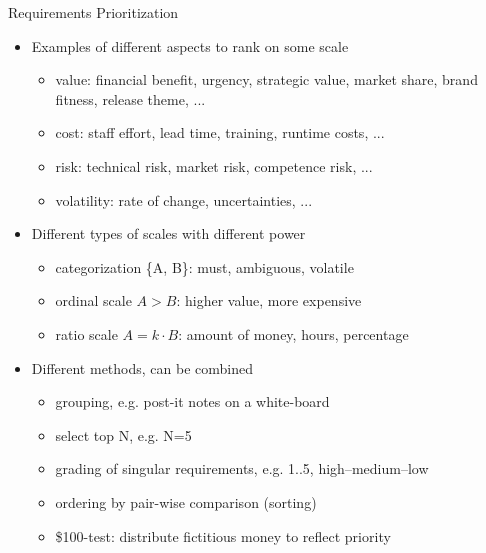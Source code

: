 \documentclass{simpleslides}
\begin{document}
\begin{frame}[fragile]{Requirements Prioritization}

\begin{itemize}
\item Examples of different aspects to rank on some scale
\begin{itemize}
  \item value: financial benefit, urgency, strategic value, market share, brand fitness, release theme, ...
  \item cost: staff effort, lead time, training, runtime costs, ... 
  \item risk: technical risk, market risk, competence risk, ...
  \item volatility: rate of change, uncertainties, ...
\end{itemize}
\item Different types of scales with different power
\begin{itemize}
  \item categorization \{A, B\}: must, ambiguous, volatile
  \item ordinal scale $A > B$: higher value, more expensive 
  \item ratio scale $A = k \cdot B$: amount of money, hours, percentage
\end{itemize}
\item Different methods, can be combined
\begin{itemize}
  \item grouping, e.g. post-it notes on a white-board
  \item select top N, e.g. N=5
  \item grading of singular requirements, e.g. 1..5, high--medium--low 
  \item ordering by pair-wise comparison (sorting)
  \item \$100-test: distribute fictitious money to reflect priority
\end{itemize}
\end{itemize}
\end{frame}
\end{document}
